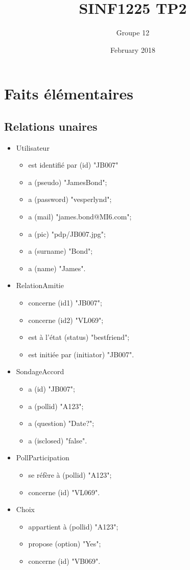 \documentclass{article}
\title{SINF1225 TP2}
\author{Groupe 12}
\date{February 2018}
\begin{document}
\maketitle

\section{Faits élémentaires}

\subsection{Relations unaires}

\begin{itemize}
    \item Utilisateur
        \begin{itemize}
        \item est identifié par (id) "JB007"
        \item a (pseudo) "JamesBond";
        \item a (password) "vesperlynd";
        \item a (mail) "james.bond@MI6.com";
        \item a (pic) "pdp/JB007.jpg";
        \item a (surname) "Bond";
        \item a (name) "James".
    \end{itemize}
    \item RelationAmitie
    \begin{itemize}
        \item concerne (id1) "JB007";
        \item concerne (id2) "VL069";
        \item est à l'état (status) "bestfriend";
        \item est initiée par (initiator) "JB007".
    \end{itemize}
    \item SondageAccord
    \begin{itemize}
        \item a (id) "JB007";
        \item a (pollid) "A123";
        \item a (question) "Date?";
        \item a (isclosed) "false".
    \end{itemize}
    \item PollParticipation
    \begin{itemize}
        \item se réfère à (pollid) "A123";
        \item concerne (id) "VL069".
    \end{itemize}
    \item Choix
    \begin{itemize}
        \item appartient à (pollid) "A123";
        \item propose (option) "Yes";
        \item concerne (id) "VB069".
    \end{itemize}
\end{itemize}
\end{document}
